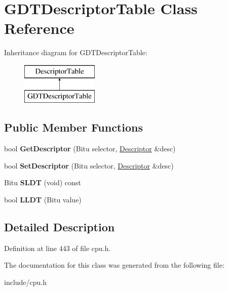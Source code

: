 \hypertarget{classGDTDescriptorTable}{\section{G\-D\-T\-Descriptor\-Table Class Reference}
\label{classGDTDescriptorTable}
}
Inheritance diagram for G\-D\-T\-Descriptor\-Table\-:\begin{figure}[H]
\begin{center}
\leavevmode
\includegraphics[height=2.000000cm]{classGDTDescriptorTable}
\end{center}
\end{figure}
\subsection*{Public Member Functions}
\begin{DoxyCompactItemize}
\item 
\hypertarget{classGDTDescriptorTable_ac76fa58e1a03cd52a1a8e180ac42c52a}{bool {\bfseries Get\-Descriptor} (Bitu selector, \hyperlink{classDescriptor}{Descriptor} \&desc)}\label{classGDTDescriptorTable_ac76fa58e1a03cd52a1a8e180ac42c52a}

\item 
\hypertarget{classGDTDescriptorTable_a6f67ad7a7d505aec8a23dc42bc078cbc}{bool {\bfseries Set\-Descriptor} (Bitu selector, \hyperlink{classDescriptor}{Descriptor} \&desc)}\label{classGDTDescriptorTable_a6f67ad7a7d505aec8a23dc42bc078cbc}

\item 
\hypertarget{classGDTDescriptorTable_ad4541f8edd71d3669157d54a75a4e01b}{Bitu {\bfseries S\-L\-D\-T} (void) const }\label{classGDTDescriptorTable_ad4541f8edd71d3669157d54a75a4e01b}

\item 
\hypertarget{classGDTDescriptorTable_aa6ef4a40eaec4d675ce8e4d06f26f0db}{bool {\bfseries L\-L\-D\-T} (Bitu value)}\label{classGDTDescriptorTable_aa6ef4a40eaec4d675ce8e4d06f26f0db}

\end{DoxyCompactItemize}


\subsection{Detailed Description}


Definition at line 443 of file cpu.\-h.



The documentation for this class was generated from the following file\-:\begin{DoxyCompactItemize}
\item 
include/cpu.\-h\end{DoxyCompactItemize}
